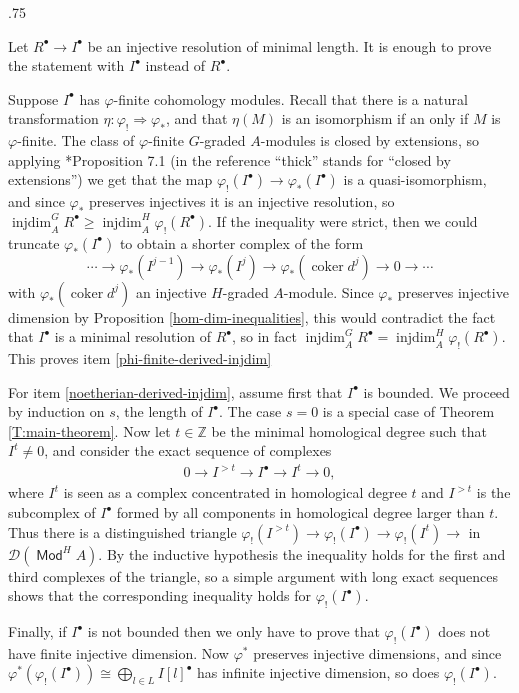 \documentclass[11pt,fleqn]{article}
\makeatletter
\renewenvironment{proof}[1][\textit{Proof}]{\par
  \pushQED{\qed}%
  \normalfont \topsep.75\paraskip\relax
  \trivlist
  \item[\hskip\labelsep
        \itshape
    #1\@addpunct{.}]\ignorespaces
}{%
  \popQED\endtrivlist\@endpefalse
}
\newcommand\ZZ{\mathbb Z}
\renewcommand\to{\longrightarrow}
\renewcommand\phi{\varphi}
\newcommand\D{\mathcal D}
\DeclareMathOperator\Mod{\mathsf{Mod}}
\DeclareMathOperator\injdim{injdim}
\DeclareMathOperator\coker{coker}
\makeatother
\begin{document}
\begin{proof}
Let $R^\bullet \to I^\bullet$ be an injective resolution of minimal length.
It is enough to prove the statement with $I^\bullet$ instead of $R^\bullet$.

Suppose $I^\bullet$ has $\phi$-finite cohomology modules. Recall that there is 
a natural transformation $\eta: \phi_! \Rightarrow \phi_*$, and that $\eta(M)$ 
is an isomorphism if an only if $M$ is $\phi$-finite. The class of 
$\phi$-finite $G$-graded $A$-modules is closed by extensions, so applying 
\cite{Hart-RD}*{Proposition 7.1} (in the reference ``thick'' stands for 
``closed by extensions'') we get that the map $\phi_!(I^\bullet) \to 
\phi_*(I^\bullet)$ is a quasi-isomorphism, and since $\phi_*$ preserves 
injectives it is an injective resolution, so $\injdim_A^{G} R^\bullet \geq 
\injdim_A^H \phi_!(R^\bullet)$. If the inequality were strict, then we could 
truncate $\phi_*(I^\bullet)$ to obtain a shorter complex of the form
\[
\cdots 
  \to \phi_*(I^{j-1}) 
  \to \phi_*(I^{j}) 
  \to \phi_*(\coker d^j) 
  \to 0 
  \to \cdots
\]
with $\phi_*(\coker d^j)$ an injective $H$-graded $A$-module. Since $\phi_*$
preserves injective dimension by Proposition \ref{hom-dim-inequalities}, this
would contradict the fact that $I^\bullet$ is a minimal resolution of 
$R^\bullet$, so in fact $\injdim_A^{G} R^\bullet = \injdim_A^H 
\phi_!(R^\bullet)$. This proves item \ref{phi-finite-derived-injdim}

For item \ref{noetherian-derived-injdim}, assume first that $I^\bullet$ is 
bounded. We proceed by induction on $s$, the length of $I^\bullet$. The case 
$s = 0$ is a special case of Theorem \ref{T:main-theorem}. Now let $t \in \ZZ$ 
be the minimal homological degree such that $I^t \neq 0$, and consider the 
exact sequence of complexes
\begin{align*}
0 \to I^{> t} \to I^\bullet \to I^t \to 0,
\end{align*}
where $I^t$ is seen as a complex concentrated in homological degree $t$ and
$I^{> t}$ is the subcomplex of $I^\bullet$ formed by all components in 
homological degree larger than $t$. Thus there is a distinguished triangle
$\phi_!(I^{> t}) \to \phi_!(I^\bullet) \to \phi_!(I^t) \to$ in $\D(\Mod^H A)$.
By the inductive hypothesis the inequality holds for the first and third 
complexes of the triangle, so a simple argument with long exact sequences 
shows that the corresponding inequality holds for $\phi_!(I^\bullet)$.

Finally, if $I^\bullet$ is not bounded then we only have to prove that 
$\phi_!(I^\bullet)$ does not have finite injective dimension. Now $\phi^*$
preserves injective dimensions, and since $\phi^*(\phi_!(I^\bullet)) \cong 
\bigoplus_{l \in L} I[l]^\bullet$ has infinite injective dimension, so does
$\phi_!(I^\bullet)$.
\end{proof}
\end{document}
